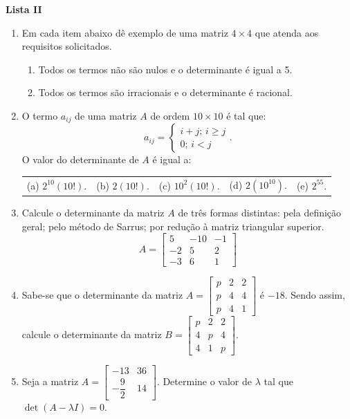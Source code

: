 \documentclass[12pt,a4paper]{article}
\begin{document}
\begin{center}
  \textbf{Lista II}
\end{center}

\begin{enumerate}
  \item Em cada item abaixo dê exemplo de uma matriz $4\times 4$ que atenda aos requisitos solicitados.
    \begin{enumerate}
      \item Todos os termos não são nulos e o determinante é igual a 5.
      \item Todos os termos são irracionais e o determinante é racional.
    \end{enumerate}

  \item O termo $a_{ij}$ de uma matriz $A$ de ordem $10\times 10$ é tal que:
    $$a_{ij} = \begin{cases}i+j;\,i\geq j \\ 0;\,i<j\end{cases}.$$ O valor do
    determinante de $A$ é igual a:
    
    \begin{tabular}{lllll}
      (a) $2^{10}\left(10!\right)$. & (b) $2(10!)$. & (c) $10^2(10!)$. & (d) $2\left(10^{10}\right)$. & (e) $2^{55}$.
    \end{tabular}

  \item Calcule o determinante da matriz $A$ de três formas distintas: pela
    definição geral; pelo método de Sarrus; por redução à matriz triangular
    superior. 
    $$A=\begin{bmatrix}
      5 & -10 & -1\\
      -2 & 5 & 2\\
      -3 & 6 & 1
    \end{bmatrix}$$

  \item Sabe-se que o determinante da matriz
    $A=\begin{bmatrix}
      p & 2 & 2\\
      p & 4 & 4\\
      p & 4 & 1
    \end{bmatrix}$ é $-18$. Sendo assim, calcule
    o determinante da matriz
    $B=\begin{bmatrix}
      p & 2 & 2\\
      4 & p & 4\\
      4 & 1 & p
    \end{bmatrix}$.

  \item Seja a matriz
    $A=\begin{bmatrix} -13 & 36 \\ -\dfrac{9}{2} & 14 \end{bmatrix}$.
    Determine o valor de $\lambda$ tal que $\det(A-\lambda I) = 0$.

\end{enumerate}
  
\end{document}
